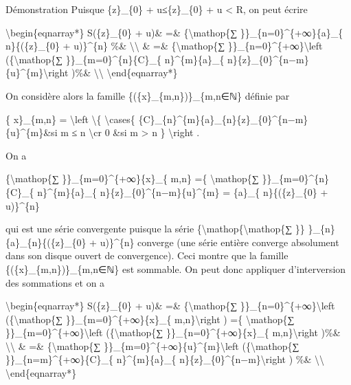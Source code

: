 \documentclass[]{article}
\begin{document}
Démonstration Puisque \textbar{}\{z\}\_\{0\} +
u\textbar{}≤\textbar{}\{z\}\_\{0\}\textbar{} + \textbar{}u\textbar{}
\textless{} R, on peut écrire

\textbackslash{}begin\{eqnarray*\} S(\{z\}\_\{0\} + u)\& =\&
\{\textbackslash{}mathop\{∑ \}\}\_\{n=0\}\^{}\{+∞\}\{a\}\_\{
n\}\{(\{z\}\_\{0\} + u)\}\^{}\{n\} \%\& \textbackslash{}\textbackslash{}
\& =\& \{\textbackslash{}mathop\{∑
\}\}\_\{n=0\}\^{}\{+∞\}\textbackslash{}left (\{\textbackslash{}mathop\{∑
\}\}\_\{m=0\}\^{}\{n\}\{C\}\_\{ n\}\^{}\{m\}\{a\}\_\{
n\}\{z\}\_\{0\}\^{}\{n−m\}\{u\}\^{}\{m\}\textbackslash{}right )\%\&
\textbackslash{}\textbackslash{} \textbackslash{}end\{eqnarray*\}

On considère alors la famille \{(\{x\}\_\{m,n\})\}\_\{m,n∈ℕ\} définie
par

\{ x\}\_\{m,n\} = \textbackslash{}left \textbackslash{}\{
\textbackslash{}cases\{
\{C\}\_\{n\}\^{}\{m\}\{a\}\_\{n\}\{z\}\_\{0\}\^{}\{n−m\}\{u\}\^{}\{m\}\&si
m ≤ n \textbackslash{}cr 0 \&si m \textgreater{} n \}
\textbackslash{}right .

On a

\{\textbackslash{}mathop\{∑ \}\}\_\{m=0\}\^{}\{+∞\}\textbar{}\{x\}\_\{
m,n\}\textbar{} =\{ \textbackslash{}mathop\{∑
\}\}\_\{m=0\}\^{}\{n\}\textbar{}\{C\}\_\{ n\}\^{}\{m\}\{a\}\_\{
n\}\{z\}\_\{0\}\^{}\{n−m\}\{u\}\^{}\{m\}\textbar{} = \textbar{}\{a\}\_\{
n\}\textbar{}\{(\textbar{}\{z\}\_\{0\}\textbar{} +
\textbar{}u\textbar{})\}\^{}\{n\}

qui est une série convergente puisque la série
\{\textbackslash{}mathop\{\textbackslash{}mathop\{∑ \}\}
\}\_\{n\}\textbar{}\{a\}\_\{n\}\textbar{}\{(\textbar{}\{z\}\_\{0\}\textbar{}
+ \textbar{}u\textbar{})\}\^{}\{n\} converge (une série entière converge
absolument dans son disque ouvert de convergence). Ceci montre que la
famille \{(\{x\}\_\{m,n\})\}\_\{m,n∈ℕ\} est sommable. On peut donc
appliquer d'interversion des sommations et on a

\textbackslash{}begin\{eqnarray*\} S(\{z\}\_\{0\} + u)\& =\&
\{\textbackslash{}mathop\{∑ \}\}\_\{n=0\}\^{}\{+∞\}\textbackslash{}left
(\{\textbackslash{}mathop\{∑ \}\}\_\{m=0\}\^{}\{+∞\}\{x\}\_\{
m,n\}\textbackslash{}right ) =\{ \textbackslash{}mathop\{∑
\}\}\_\{m=0\}\^{}\{+∞\}\textbackslash{}left (\{\textbackslash{}mathop\{∑
\}\}\_\{n=0\}\^{}\{+∞\}\{x\}\_\{ m,n\}\textbackslash{}right )\%\&
\textbackslash{}\textbackslash{} \& =\& \{\textbackslash{}mathop\{∑
\}\}\_\{m=0\}\^{}\{+∞\}\{u\}\^{}\{m\}\textbackslash{}left
(\{\textbackslash{}mathop\{∑ \}\}\_\{n=m\}\^{}\{+∞\}\{C\}\_\{
n\}\^{}\{m\}\{a\}\_\{ n\}\{z\}\_\{0\}\^{}\{n−m\}\textbackslash{}right )
\%\& \textbackslash{}\textbackslash{} \textbackslash{}end\{eqnarray*\}
\end{document}

